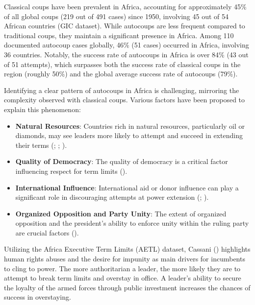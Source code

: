 \documentclass[
  12pt,
]{report}
\begin{document}
Classical coups have been prevalent in Africa, accounting for
approximately 45\% of all global coups (219 out of 491 cases) since
1950, involving 45 out of 54 African countries (GIC dataset). While
autocoups are less frequent compared to traditional coups, they maintain
a significant presence in Africa. Among 110 documented autocoup cases
globally, 46\% (51 cases) occurred in Africa, involving 36 countries.
Notably, the success rate of autocoups in Africa is over 84\% (43 out of
51 attempts), which surpasses both the success rate of classical coups
in the region (roughly 50\%) and the global average success rate of
autocoups (79\%).

Identifying a clear pattern of autocoups in Africa is challenging,
mirroring the complexity observed with classical coups. Various factors
have been proposed to explain this phenomenon:

\begin{itemize}
\item
  \textbf{Natural Resources}: Countries rich in natural resources,
  particularly oil or diamonds, may see leaders more likely to attempt
  and succeed in extending their terms (; ;
  ).
\item
  \textbf{Quality of Democracy}: The quality of democracy is a critical
  factor influencing respect for term limits
  ().
\item
  \textbf{International Influence}: International aid or donor influence
  can play a significant role in discouraging attempts at power
  extension (;
  ).
\item
  \textbf{Organized Opposition and Party Unity}: The extent of organized
  opposition and the president's ability to enforce unity within the
  ruling party are crucial factors
  ().
\end{itemize}

Utilizing the Africa Executive Term Limits (AETL) dataset, Cassani
() highlights human rights abuses and
the desire for impunity as main drivers for incumbents to cling to
power. The more authoritarian a leader, the more likely they are to
attempt to break term limits and overstay in office. A leader's ability
to secure the loyalty of the armed forces through public investment
increases the chances of success in overstaying.
\end{document}
